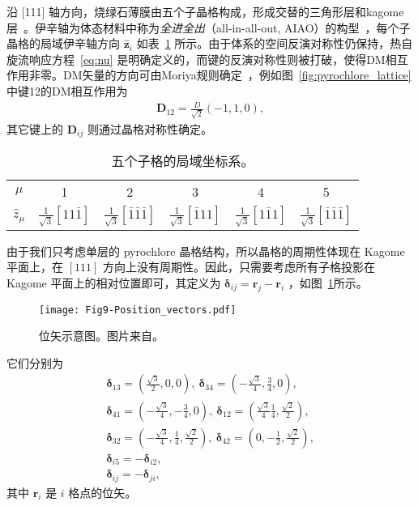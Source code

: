         沿 [111] 轴方向，烧绿石薄膜由五个子晶格构成，形成交替的三角形层和kagome层~\cite{hu2012topological,laurell2017topological}。伊辛轴为体态材料中称为\emph{全进全出}（all-in-all-out, AIAO）的构型~\cite{li2018competing}，每个子晶格的局域伊辛轴方向 $\hat{\bm{z}}_i$ 如表~\ref{tab: local coordinate system} 所示。由于体系的空间反演对称性仍保持，热自旋流响应方程~\eqref{eq:nu} 是明确定义的，而键的反演对称性则被打破，使得DM相互作用非零。DM矢量的方向可由Moriya规则确定~\cite{moriya1960anisotropic}，例如图~\ref{fig:pyrochlore_lattice} 中键12的DM相互作用为
        \begin{align}
            \bm{D}_{12}=\frac{D}{\sqrt{2}}(-1,1,0),
        \end{align}
        其它键上的 $\bm{D}_{ij}$ 则通过晶格对称性确定。
        \begin{table}
            \centering
            \caption{五个子格的局域坐标系。}
            \begin{tabular}{cccccc}
                \hline
                \hline
                $\mu$ & 1 & 2 & 3 & 4 & 5\\
                $\hat{z}_\mu$ &$\frac{1}{\sqrt{3}}[11\bar{1}]$  &$\frac{1}{\sqrt{3}}[\bar{1}\bar{1}\bar{1}]$  &$\frac{1}{\sqrt{3}}[\bar{1}11]$  &$\frac{1}{\sqrt{3}}[1\bar{1}1]$  &$\frac{1}{\sqrt{3}}[\bar{1}\bar{1}\bar{1}]$\\
                \hline
                \hline
            \end{tabular}
            \label{tab: local coordinate system}
        \end{table}

        由于我们只考虑单层的 pyrochlore 晶格结构，所以晶格的周期性体现在 Kagome 平面上，在 $[111]$ 方向上没有周期性。因此，只需要考虑所有子格投影在 Kagome 平面上的相对位置即可，其定义为 $\bm{\delta}_{ij}=\bm{r}_j-\bm{r}_i$ ，如图~\ref{fig:delta}所示。
        \begin{figure}
            \centering
            \texttt{[image: Fig9-Position\_vectors.pdf]}
            \caption{位矢示意图。图片来自\cite{lu2024Spin}。}
            \label{fig:delta}
        \end{figure}
        它们分别为
        \begin{gather}
            \bm{\delta}_{13}=(\frac{\sqrt{3}}{2},0,0),\  \bm{\delta}_{34}=(-\frac{\sqrt{3}}{4},\frac{3}{4},0),\\
            \bm{\delta}_{41}=(-\frac{\sqrt{3}}{4},-\frac{3}{4},0),\ \bm{\delta}_{12}=(\frac{\sqrt{3}}{4}
            \frac{1}{4},\frac{\sqrt{2}}{2}),\\
            \bm{\delta}_{32}=(-\frac{\sqrt{3}}{4},\frac{1}{4},\frac{\sqrt{2}}{2}),\  \bm{\delta}_{42}=(0,-\frac{1}{2},\frac{\sqrt{2}}{2}), \\
            \bm{\delta}_{i5}=-\bm{\delta}_{i2},\\
            \bm{\delta}_{ij}=-\bm{\delta}_{ji},
        \end{gather}
        其中 $\bm{r}_i$ 是 $i$ 格点的位矢。


